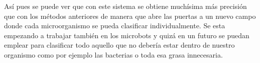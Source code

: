 \documentclass[a4paper, 12pt, UTF8]{article}
\begin{document}
Así pues se puede ver que con este sistema se obtiene muchísima más precisión que con los métodos anteriores de manera que abre las puertas a un nuevo campo donde cada microorganismo se pueda clasificar individualmente. Se esta empezando a trabajar también en los microbots \cite{microbots} y quizá en un futuro se puedan emplear para clasificar todo aquello que no debería estar dentro de nuestro organismo como por ejemplo las bacterias o toda esa grasa innecesaria. 



\end{document}
